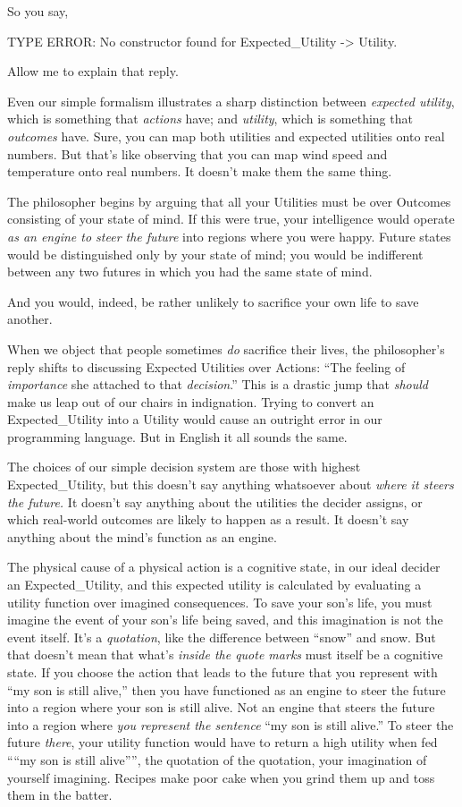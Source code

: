 {
 So you say,}

{
 TYPE ERROR: No constructor found for Expected\_Utility
-{\textgreater} Utility.}

{
 Allow me to explain that reply.}

{
 Even our simple formalism illustrates a sharp distinction between
\textit{expected utility}, which is something that \textit{actions}
have; and \textit{utility}, which is something that \textit{outcomes}
have. Sure, you can map both utilities and expected utilities onto real
numbers. But that's like observing that you can map
wind speed and temperature onto real numbers. It
doesn't make them the same thing.}

{
 The philosopher begins by arguing that all your Utilities must be
over Outcomes consisting of your state of mind. If this were true, your
intelligence would operate \textit{as an engine to steer the future}
into regions where you were happy. Future states would be distinguished
only by your state of mind; you would be indifferent between any two
futures in which you had the same state of mind.}

{
 And you would, indeed, be rather unlikely to sacrifice your own
life to save another.}

{
 When we object that people sometimes \textit{do} sacrifice their
lives, the philosopher's reply shifts to discussing
Expected Utilities over Actions: ``The feeling of
\textit{importance} she attached to that
\textit{decision}.'' This is a drastic jump that
\textit{should} make us leap out of our chairs in indignation. Trying
to convert an Expected\_Utility into a Utility would cause an outright
error in our programming language. But in English it all sounds the
same.}

{
 The choices of our simple decision system are those with highest
Expected\_Utility, but this doesn't say anything
whatsoever about \textit{where it steers the future.} It
doesn't say anything about the utilities the decider
assigns, or which real-world outcomes are likely to happen as a result.
It doesn't say anything about the
mind's function as an engine.}

{
 The physical cause of a physical action is a cognitive state, in
our ideal decider an Expected\_Utility, and this expected utility is
calculated by evaluating a utility function over imagined consequences.
To save your son's life, you must imagine the event of
your son's life being saved, and this imagination is
not the event itself. It's a \textit{quotation}, like
the difference between ``snow'' and
snow. But that doesn't mean that what's
\textit{inside the quote marks} must itself be a cognitive state. If
you choose the action that leads to the future that you represent with
``my son is still alive,'' then you
have functioned as an engine to steer the future into a region where
your son is still alive. Not an engine that steers the future into a
region where \textit{you represent the sentence} ``my
son is still alive.'' To steer the future
\textit{there}, your utility function would have to return a high
utility when fed ````my son is still
alive'''', the quotation of the
quotation, your imagination of yourself imagining. Recipes make poor
cake when you grind them up and toss them in the batter.}

